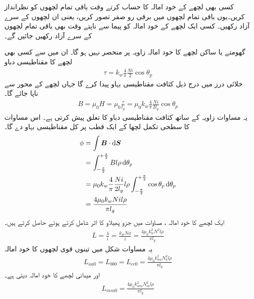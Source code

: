 کسی بھی لچھے کے خود امالہ کا حساب کرتے وقت باقی تمام لچھوں کو نظرانداز کریں۔یوں  باقی تمام لچھوں میں برقی رو صفر تصور کریں، یعنی ان لچھوں  کے سرے آزاد رکھیں۔ کسی ایک لچھے کے خود امالہ کو پیما سے ناپتے وقت بھی باقی تمام لچھوں کے سرے آزاد رکھیں جائیں گے۔ 


گھومتے یا ساکن لچھے کا خود امالہ  زاویہ  پر منحصر نہیں ہو گا۔ ان میں سے کسی بھی لچھے کا مقناطیسی دباو  
\begin{align}
\tau=k_w \frac{4}{\pi}\frac{N i}{2} \cos \theta_p
\end{align}
خلائی درز میں درج ذیل  کثافت مقناطیسی بہاو   پیدا کرے گا جہاں  لچھے کے محور سے ناپا جائے گا۔	
\begin{align}
B=\mu_0 H=\mu_0 \frac{\tau}{l_g}=\mu_0 k_w \frac{4}{\pi}\frac{N i}{2 l_g} \cos \theta_p
\end{align}
یہ مساوات زاویہ  کے ساتھ  کثافت مقناطیسی دباو  کا تعلق پیش کرتی ہے۔ اس مساوات کا سطحی تکمل لچھا کے ایک قطب پر  کل مقناطیسی بہاو   دے گا۔
\begin{gather}
\begin{aligned}\label{مساوات_معاصر_بہاو_بذریع_سطحی_تکمل}
\phi&=\int \kvec{B} \cdot \dif \kvec{S}\\
&=\int_{-\frac{\pi}{2}}^{+\frac{\pi}{2}} B l \rho \dif \theta_p\\
&=\mu_0 k_w \frac{4}{\pi}\frac{N i}{2 l_g} l \rho \int_{-\frac{\pi}{2}}^{+\frac{\pi}{2}}  \cos  \theta_p \dif \theta_p\\
&=\frac{4 \mu_0 k_w N i l \rho}{\pi l_g}
\end{aligned}
\end{gather}
ایک  لچھے کا خود امالہ ،  مساوات  میں جزو پھیلاو  کا اثر  شامل کرتے ہوئے  حاصل کرتے ہیں۔
\begin{align}
L=\frac{\lambda}{i}=\frac{k_w N \phi}{i}=\frac{4 \mu_0 k_w^2 N^2  l \rho}{\pi l_g}
\end{align}
یہ مساوات شکل  میں تینوں قوی لچھوں کا خود امالہ
\begin{align}\label{مساوات_معاصر_تین_ساکن_امالہ_برابر}
L_{aa0}=L_{bb0}=L_{cc0}=\frac{4 \mu_0 k_{wa}^2 N_a^2  l \rho}{\pi l_g}
\end{align}
اور  میدانی لچھے کا خود امالہ دیتی ہے۔
\begin{align}
L_{mm0}=\frac{4 \mu_0 k_{wm}^2 N_m^2  l \rho}{\pi l_g}
\end{align}


